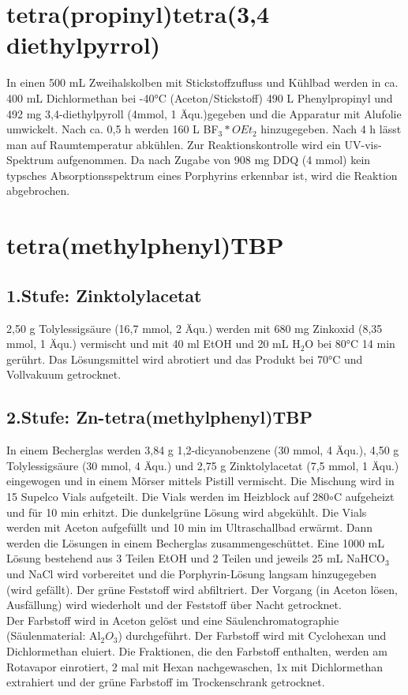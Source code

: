 \section{tetra(propinyl)tetra(3,4 diethylpyrrol)}

In einen 500 mL Zweihalskolben mit Stickstoffzufluss und Kühlbad werden in ca. 400 mL Dichlormethan bei -40°C (Aceton/Stickstoff) 490 \textmu L Phenylpropinyl und 492 mg 3,4-diethylpyroll (4mmol, 1 Äqu.)gegeben und die Apparatur mit Alufolie umwickelt. Nach ca. 0,5 h werden 160 \textmu L BF$_3*OEt_2$ hinzugegeben. Nach 4 h lässt man auf Raumtemperatur abkühlen. Zur Reaktionskontrolle wird ein UV-vis-Spektrum aufgenommen. Da nach Zugabe von 908 mg DDQ (4 mmol) kein typsches Absorptionsspektrum eines Porphyrins erkennbar ist, wird die Reaktion abgebrochen.


\section{tetra(methylphenyl)TBP}
\subsection{1.Stufe: Zinktolylacetat}

2,50 g Tolylessigsäure (16,7 mmol, 2 Äqu.) werden mit 680 mg Zinkoxid (8,35 mmol, 1 Äqu.) vermischt und mit 40 ml EtOH und 20 mL H$_2$O bei 80°C 14 min gerührt. Das Lösungsmittel wird abrotiert und das Produkt bei 70°C und Vollvakuum getrocknet.

\subsection{2.Stufe: Zn-tetra(methylphenyl)TBP}

In einem Becherglas werden 3,84 g 1,2-dicyanobenzene (30 mmol, 4 Äqu.), 4,50 g Tolylessigsäure (30 mmol, 4 Äqu.) und 2,75 g Zinktolylacetat (7,5 mmol, 1 Äqu.) eingewogen und in einem Mörser mittels Pistill vermischt. Die Mischung wird in 15 Supelco Vials aufgeteilt. Die Vials werden im Heizblock auf 280$\circ$C aufgeheizt und für 10 min erhitzt. Die dunkelgrüne Lösung wird abgekühlt. Die Vials werden mit Aceton aufgefüllt und 10 min im Ultraschallbad erwärmt. Dann werden  die Lösungen in einem Becherglas zusammengeschüttet. Eine 1000 mL Lösung bestehend aus 3 Teilen EtOH und 2 Teilen und jeweils 25 mL NaHCO$_3$ und NaCl wird vorbereitet und die Porphyrin-Lösung langsam hinzugegeben (wird gefällt). Der grüne Feststoff wird abfiltriert. Der Vorgang (in Aceton lösen, Ausfällung) wird wiederholt und der Feststoff über Nacht getrocknet.
\\Der Farbstoff wird in Aceton gelöst und eine Säulenchromatographie (Säulenmaterial: Al$_2O_3$) durchgeführt. Der Farbstoff wird mit Cyclohexan und Dichlormethan eluiert. Die Fraktionen, die den Farbstoff enthalten, werden am Rotavapor einrotiert, 2 mal mit Hexan nachgewaschen, 1x mit  Dichlormethan extrahiert und der grüne Farbstoff im Trockenschrank getrocknet.

